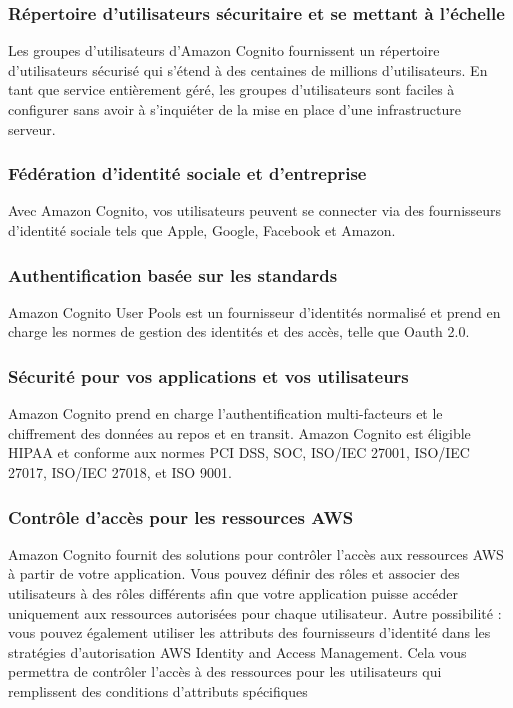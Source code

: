 \subsubsection{Répertoire d’utilisateurs sécuritaire et se mettant à l’échelle}
Les groupes d’utilisateurs d’Amazon Cognito fournissent un répertoire d’utilisateurs sécurisé qui s’étend à
des centaines de millions d’utilisateurs. En tant que service entièrement géré, les groupes d’utilisateurs sont
faciles à configurer sans avoir à s’inquiéter de la mise en place d’une infrastructure serveur.
\subsubsection{Fédération d’identité sociale et d’entreprise}
Avec Amazon Cognito, vos utilisateurs peuvent se connecter via des fournisseurs d’identité sociale tels
que Apple, Google, Facebook et Amazon.

\subsubsection{Authentification basée sur les standards}
Amazon Cognito User Pools est un fournisseur d’identités normalisé et prend en charge les normes de
gestion des identités et des accès, telle que Oauth 2.0.
\subsubsection{Sécurité pour vos applications et vos utilisateurs}
Amazon Cognito prend en charge l’authentification multi-facteurs et le chiffrement des données au repos et
en transit. Amazon Cognito est éligible HIPAA et conforme aux normes PCI DSS, SOC, ISO/IEC 27001,
ISO/IEC 27017, ISO/IEC 27018, et ISO 9001.
\subsubsection{Contrôle d’accès pour les ressources AWS}
Amazon Cognito fournit des solutions pour contrôler l’accès aux ressources AWS à partir de votre application. Vous pouvez définir des rôles et associer des utilisateurs à des rôles différents afin que votre
application puisse accéder uniquement aux ressources autorisées pour chaque utilisateur. Autre possibilité
: vous pouvez également utiliser les attributs des fournisseurs d’identité dans les stratégies d’autorisation
AWS Identity and Access Management. Cela vous permettra de contrôler l’accès à des ressources pour les
utilisateurs qui remplissent des conditions d’attributs spécifiques
